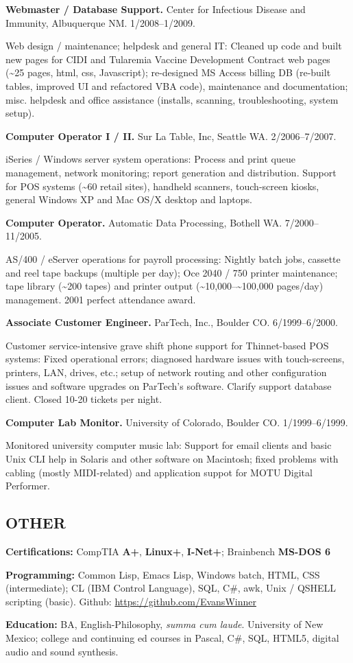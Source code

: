 \documentclass[utopia,letterpaper,10pt,microtype,paralist]{article}
\begin{document}
\textbf{Webmaster / Database Support.} Center for Infectious Disease and
Immunity, Albuquerque NM. 1/2008--1/2009.

Web design / maintenance; helpdesk and general IT: Cleaned up code and
built new pages for CIDI and Tularemia Vaccine Development Contract
web pages (\textasciitilde{}25 pages, html, css, Javascript); re-designed MS Access
billing DB (re-built tables, improved UI and refactored VBA code),
maintenance and documentation; misc. helpdesk and office assistance
(installs, scanning, troubleshooting, system setup).

\textbf{Computer Operator I / II.} Sur La Table, Inc, Seattle WA.
2/2006--7/2007.

iSeries / Windows server system operations: Process and print queue
management, network monitoring; report generation and distribution.
Support for POS systems (\textasciitilde{}60 retail sites), handheld scanners,
touch-screen kiosks, general Windows XP and Mac OS/X desktop and
laptops.

\textbf{Computer Operator.} Automatic Data Processing, Bothell WA.
7/2000--11/2005.

AS/400 / eServer operations for payroll processing: Nightly batch
jobs, cassette and reel tape backups (multiple per day); Oce 2040 /
750 printer maintenance; tape library (\textasciitilde{}200 tapes) and printer output
(\textasciitilde{}10,000--\textasciitilde{}100,000 pages/day) management.  2001 perfect attendance
award.

\textbf{Associate Customer Engineer.} ParTech, Inc., Boulder
CO. 6/1999--6/2000.

Customer service-intensive grave shift phone support for Thinnet-based
POS systems: Fixed operational errors; diagnosed hardware issues with
touch-screens, printers, LAN, drives, etc.; setup of network routing
and other configuration issues and software upgrades on ParTech's
software.  Clarify support database client.  Closed 10-20 tickets per
night.

\textbf{Computer Lab Monitor.} University of Colorado, Boulder CO.
1/1999--6/1999.

Monitored university computer music lab: Support for email clients and
basic Unix CLI help in Solaris and other software on Macintosh; fixed
problems with cabling (mostly MIDI-related) and application suppot for
MOTU Digital Performer.

\subsection*{OTHER}
\label{sec-1-3}

\textbf{Certifications:} CompTIA \textbf{A+}, \textbf{Linux+}, \textbf{I-Net+}; Brainbench \textbf{MS-DOS
6}

\textbf{Programming:} Common Lisp, Emacs Lisp, Windows batch, HTML, CSS
(intermediate); CL (IBM Control Language), SQL, C\#, awk, Unix / QSHELL
scripting (basic).  Github: \url{https://github.com/EvansWinner}

\textbf{Education:} BA, English-Philosophy, \emph{summa cum laude}. University of
New Mexico; college and continuing ed courses in Pascal, C\#, SQL,
HTML5, digital audio and sound synthesis.
\end{document}
